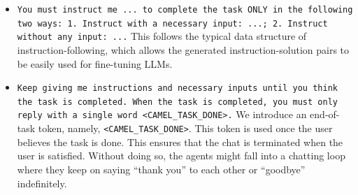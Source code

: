 \begin{itemize}[leftmargin=0.5cm]
    \item \texttt{You must instruct me  ... to complete the task ONLY in the following two ways: 1. Instruct with a necessary input: ...; 2. Instruct without any input: ...} This follows the typical data structure of instruction-following, which allows the generated instruction-solution pairs to be easily used for fine-tuning LLMs.
    \item \texttt{Keep giving me instructions and necessary inputs until you think the task is completed. When the task is completed, you must only reply with a single word <CAMEL\_TASK\_DONE>.} We introduce an end-of-task token, namely, \texttt{<CAMEL\_TASK\_DONE>}. This token is used once the user believes the task is done. This ensures that the chat is terminated when the user is satisfied. Without doing so, the agents might fall into a chatting loop where they keep on saying ``thank you'' to each other or ``goodbye'' indefinitely. 
\end{itemize}
